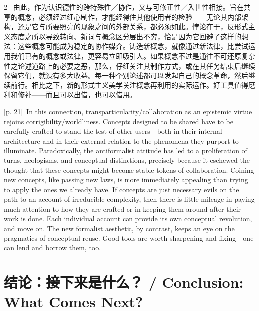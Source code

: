 \documentclass[10pt,a4paper]{article}
\begin{document}
\begin{paracol}{2}
\switchcolumn*
{\scriptsize\color{gray} [p. 21]}\ 由此，作为认识德性的跨特殊性／协作，又与可修正性／入世性相接。旨在共享的概念，必须经过细心制作，才能经得住其他使用者的检验——无论其内部架构，还是它与所要照亮的现象之间的外部关系，都必须如此。悖论在于，反形式主义态度之所以导致转向、新词与概念区分层出不穷，恰是因为它回避了这样的想法：这些概念可能成为稳定的协作媒介。铸造新概念，就像通过新法律，比尝试运用我们已有的概念或法律，更容易立即吸引人。如果概念不过是通往不可还原复杂性之论述道路上的必要之恶，那么，仔细关注其制作方式，或在其任务结束后继续保留它们，就没有多大收益。每一种个别论述都可以发起自己的概念革命，然后继续前行。相比之下，新的形式主义美学关注概念再利用的实际运作。好工具值得磨利和修补——而且可以出借，也可以借用。\par
\switchcolumn
{\scriptsize\color{gray} [p. 21]}\ In this connection, transparticularity/collaboration as an epistemic virtue rejoins corrigibility/worldliness. Concepts designed to be shared have to be carefully crafted to stand the test of other users––both in their internal architecture and in their external relation to the phenomena they purport to illuminate. Paradoxically, the antiformalist attitude has led to a proliferation of turns, neologisms, and conceptual distinctions, precisely because it eschewed the thought that these concepts might become stable tokens of collaboration. Coining new concepts, like passing new laws, is more immediately appealing than trying to apply the ones we already have. If concepts are just necessary evils on the path to an account of irreducible complexity, then there is little mileage in paying much attention to how they are crafted or in keeping them around after their work is done. Each individual account can provide its own conceptual revolution, and move on. The new formalist aesthetic, by contrast, keeps an eye on the pragmatics of conceptual reuse. Good tools are worth sharpening and fixing—one can lend and borrow them, too.\par
\switchcolumn*
\end{paracol}
\section*{结论：接下来是什么？ / Conclusion: What Comes Next?}
\end{document}
